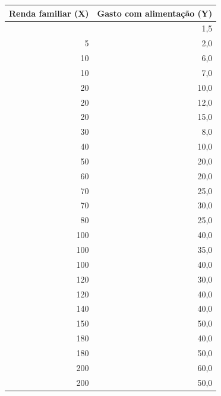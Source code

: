 \documentclass[11pt]{article}
\begin{document}
{\def\LTcaptype{none} %
\begin{longtable}[]{@{}rr@{}}
\toprule\noalign{}
Renda familiar (X) & Gasto com alimentação (Y) \\
\midrule\noalign{}
\endhead
\bottomrule\noalign{}
\endlastfoot
3 & 1,5 \\
5 & 2,0 \\
10 & 6,0 \\
10 & 7,0 \\
20 & 10,0 \\
20 & 12,0 \\
20 & 15,0 \\
30 & 8,0 \\
40 & 10,0 \\
50 & 20,0 \\
60 & 20,0 \\
70 & 25,0 \\
70 & 30,0 \\
80 & 25,0 \\
100 & 40,0 \\
100 & 35,0 \\
100 & 40,0 \\
120 & 30,0 \\
120 & 40,0 \\
140 & 40,0 \\
150 & 50,0 \\
180 & 40,0 \\
180 & 50,0 \\
200 & 60,0 \\
200 & 50,0 \\
\end{longtable}
}
\end{document}
